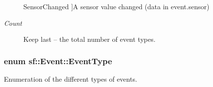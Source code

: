 \begin{Desc}
\begin{description}
{\hypertarget{classsf_1_1_event_af41fa9ed45c02449030699f671331d4aac175c7fb90d3b03cda554ada20d42795}{Sensor\-Changed}\label{classsf_1_1_event_af41fa9ed45c02449030699f671331d4aac175c7fb90d3b03cda554ada20d42795}
}]A sensor value changed (data in event.\-sensor) \item[{\em 
\hypertarget{classsf_1_1_event_af41fa9ed45c02449030699f671331d4aae5c49a2d50ccccd9c941e6be36b0d05f}{Count}\label{classsf_1_1_event_af41fa9ed45c02449030699f671331d4aae5c49a2d50ccccd9c941e6be36b0d05f}
}]Keep last -- the total number of event types. \end{description}
\end{Desc}
\hypertarget{classsf_1_1_event_af41fa9ed45c02449030699f671331d4a}{
\subsubsection[{Event\-Type}]{\setlength{\rightskip}{0pt plus 5cm}enum {\bf sf\-::\-Event\-::\-Event\-Type}}}\label{classsf_1_1_event_af41fa9ed45c02449030699f671331d4a}


Enumeration of the different types of events. 

